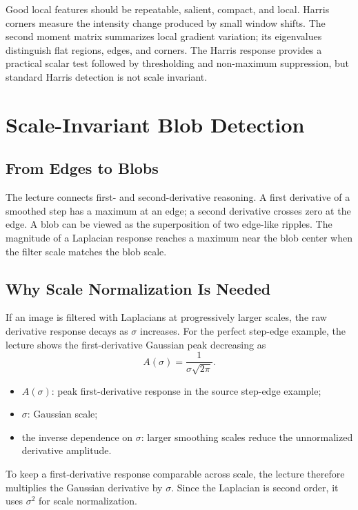 \documentclass[11pt,a4paper,oneside]{report}
\newcommand{\mathlegend}[1]{%
  \par\vspace{0.2em}{\small\itshape where}\par
  \begin{itemize}[leftmargin=1.7em,topsep=0.15em,itemsep=0.12em]
  #1
  \end{itemize}
}
\begin{document}
\begin{chaptersummary}
Good local features should be repeatable, salient, compact, and local. Harris corners measure the intensity change produced by small window shifts. The second moment matrix summarizes local gradient variation; its eigenvalues distinguish flat regions, edges, and corners. The Harris response provides a practical scalar test followed by thresholding and non-maximum suppression, but standard Harris detection is not scale invariant.
\end{chaptersummary}

\chapter{Scale-Invariant Blob Detection}

\section{From Edges to Blobs}

The lecture connects first- and second-derivative reasoning. A first derivative of a smoothed step has a maximum at an edge; a second derivative crosses zero at the edge. A blob can be viewed as the superposition of two edge-like ripples. The magnitude of a Laplacian response reaches a maximum near the blob center when the filter scale matches the blob scale.

\section{Why Scale Normalization Is Needed}

If an image is filtered with Laplacians at progressively larger scales, the raw derivative response decays as $\sigma$ increases. For the perfect step-edge example, the lecture shows the first-derivative Gaussian peak decreasing as
\begin{equation}
  A(\sigma)=\frac{1}{\sigma\sqrt{2\pi}}.
  \label{eq:dog-step-scale-response}
\end{equation}
\mathlegend{
  \item $A(\sigma)$: peak first-derivative response in the source step-edge example;
  \item $\sigma$: Gaussian scale;
  \item the inverse dependence on $\sigma$: larger smoothing scales reduce the unnormalized derivative amplitude.
}
To keep a first-derivative response comparable across scale, the lecture therefore multiplies the Gaussian derivative by $\sigma$. Since the Laplacian is second order, it uses $\sigma^2$ for scale normalization.
\end{document}
